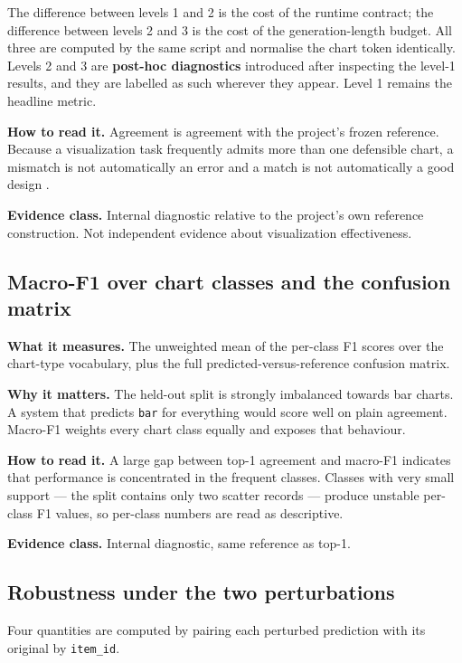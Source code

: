 The difference between levels 1 and 2 is the cost of the runtime contract; the difference between levels 2 and 3 is the cost of the generation-length budget. All three are computed by the same script and normalise the chart token identically. Levels 2 and 3 are \textbf{post-hoc diagnostics} introduced after inspecting the level-1 results, and they are labelled as such wherever they appear. Level 1 remains the headline metric.

\textbf{How to read it.} Agreement is agreement with the project's frozen reference. Because a visualization task frequently admits more than one defensible chart, a mismatch is not automatically an error and a match is not automatically a good design \cite{saket2019taskbased,kim2018taskdata,mackinlay1986apt}.

\textbf{Evidence class.} Internal diagnostic relative to the project's own reference construction. Not independent evidence about visualization effectiveness.

\subsection{Macro-F1 over chart classes and the confusion matrix}

\textbf{What it measures.} The unweighted mean of the per-class F1 scores over the chart-type vocabulary, plus the full predicted-versus-reference confusion matrix.

\textbf{Why it matters.} The held-out split is strongly imbalanced towards bar charts. A system that predicts \texttt{bar} for everything would score well on plain agreement. Macro-F1 weights every chart class equally and exposes that behaviour.

\textbf{How to read it.} A large gap between top-1 agreement and macro-F1 indicates that performance is concentrated in the frequent classes. Classes with very small support --- the split contains only two scatter records --- produce unstable per-class F1 values, so per-class numbers are read as descriptive.

\textbf{Evidence class.} Internal diagnostic, same reference as top-1.

\subsection{Robustness under the two perturbations}

Four quantities are computed by pairing each perturbed prediction with its original by \texttt{item\_id}.

